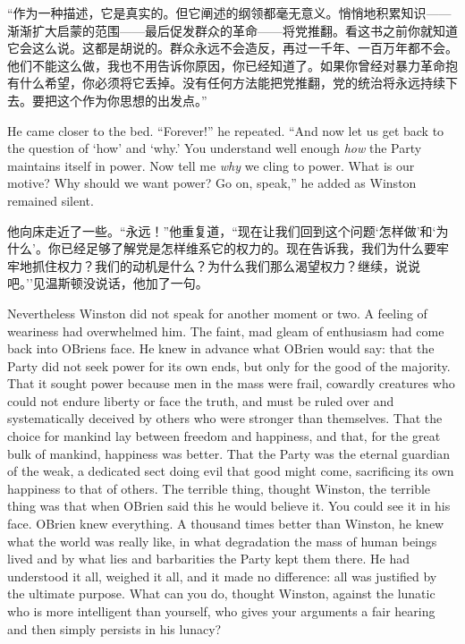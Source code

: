 \begin{paracol}{2}
\switchcolumn

``作为一种描述，它是真实的。但它阐述的纲领都毫无意义。悄悄地积累知识——渐渐扩大启蒙的范围——最后促发群众的革命——将党推翻。看这书之前你就知道它会这么说。这都是胡说的。群众永远不会造反，再过一千年、一百万年都不会。他们不能这么做，我也不用告诉你原因，你已经知道了。如果你曾经对暴力革命抱有什么希望，你必须将它丢掉。没有任何方法能把党推翻，党的统治将永远持续下去。要把这个作为你思想的出发点。''

\switchcolumn*

He came closer to the bed. ``Forever!'' he repeated. ``And now let us get
back to the question of `how' and `why.' You understand well enough
\emph{how} the Party maintains itself in power. Now tell me \emph{why} we
cling to power. What is our motive? Why should we want power? Go on,
speak,'' he added as Winston remained silent.

\switchcolumn

他向床走近了一些。``永远！''他重复道，``现在让我们回到这个问题`怎样做'和`为什么'。你已经足够了解党是怎样维系它的权力的。现在告诉我，我们为什么要牢牢地抓住权力？我们的动机是什么？为什么我们那么渴望权力？继续，说说吧。''见温斯顿没说话，他加了一句。

\switchcolumn*

Nevertheless Winston did not speak for another moment or two. A feeling
of weariness had overwhelmed him. The faint, mad gleam of enthusiasm had
come back into O\textquotesingle Brien\textquotesingle s face. He knew
in advance what O\textquotesingle Brien would say: that the Party did
not seek power for its own ends, but only for the good of the majority.
That it sought power because men in the mass were frail, cowardly
creatures who could not endure liberty or face the truth, and must be
ruled over and systematically deceived by others who were stronger than
themselves. That the choice for mankind lay between freedom and
happiness, and that, for the great bulk of mankind, happiness was
better. That the Party was the eternal guardian of the weak, a dedicated
sect doing evil that good might come, sacrificing its own happiness to
that of others. The terrible thing, thought Winston, the terrible thing
was that when O\textquotesingle Brien said this he would believe it. You
could see it in his face. O\textquotesingle Brien knew everything. A
thousand times better than Winston, he knew what the world was really
like, in what degradation the mass of human beings lived and by what
lies and barbarities the Party kept them there. He had understood it
all, weighed it all, and it made no difference: all was justified by the
ultimate purpose. What can you do, thought Winston, against the lunatic
who is more intelligent than yourself, who gives your arguments a fair
hearing and then simply persists in his lunacy?


\end{paracol}
